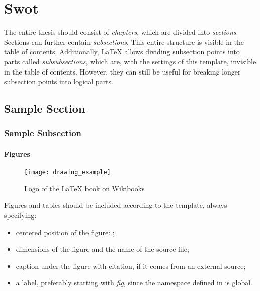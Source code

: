 \chapter{Swot}
\label{chpt:sample-chapter}

The entire thesis should consist of \emph{chapters}, which are divided
into \emph{sections}. Sections can further
contain \emph{subsections}. This entire structure is visible
in the table of contents. Additionally, LaTeX allows dividing subsection
points into parts called \emph{subsubsections}, which are, with the settings
of this template, invisible in the table of contents. However, they can still
be useful for breaking longer subsection points into logical parts.

\section{Sample Section}

\subsection{Sample Subsection}

\subsubsection{Figures}

\begin{figure}[!htb]
    \centering
    \texttt{[image: drawing\_example]}
    \caption{Logo of the LaTeX book on Wikibooks
    \cite{book:latex}}
    \label{fig:sample-figure}
\end{figure}

Figures and tables should be included according to the template, always specifying:

\begin{itemize}
    \item centered position of the figure: ;
    \item dimensions of the figure and the name of the source file;
    \item caption under the figure with citation, if it comes
    from an external source;
    \item a label, preferably starting with \emph{fig}, since
    the namespace defined in  is
    global.
\end{itemize}

